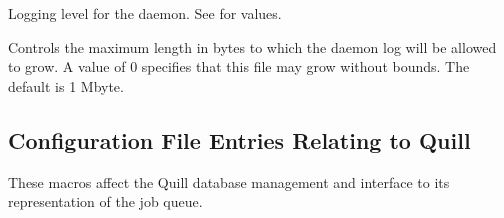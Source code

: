 \begin{description}
\label{param:TransfererDebug}
\item[\Macro{TRANSFERER\_DEBUG}]
  Logging level for the  daemon.
  See  for values.

\label{param:MaxTransfererLog}
\item[\Macro{MAX\_TRANSFERER\_LOG}]
  Controls the maximum length in bytes to which the 
  daemon log will be allowed to grow.
  A value of 0 specifies that this file may grow without bounds.
  The default is 1 Mbyte.

\end{description}


\subsection{\label{sec:Quill-Config-File-Entries}Configuration File
Entries Relating to Quill}

These macros affect the Quill database
management and interface to its representation of the job queue.

